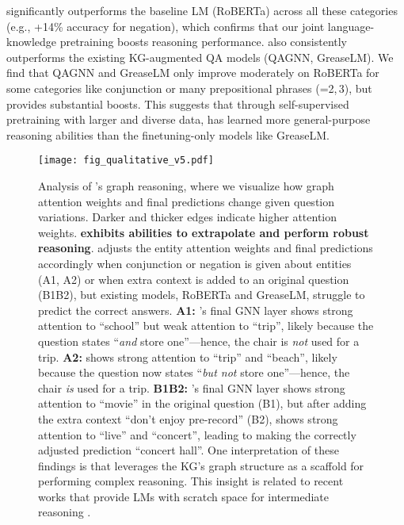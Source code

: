 \methodname significantly outperforms the baseline LM (RoBERTa) across all these categories (e.g., +14\% accuracy for negation), which confirms that our joint language-knowledge pretraining boosts reasoning performance.
\methodname also consistently outperforms the existing KG-augmented QA models (QAGNN, GreaseLM). We find that QAGNN and GreaseLM only improve moderately on RoBERTa for some categories like conjunction or many prepositional phrases (=2,\,3), but \methodname provides substantial boosts. This suggests that through self-supervised pretraining with larger and diverse data, \methodname has learned more general-purpose reasoning abilities than the finetuning-only models like GreaseLM.




\begin{figure}[t]
\vspace{-2mm}
    \hspace{-3mm}
    \texttt{[image: fig\_qualitative\_v5.pdf]}\vspace{-1mm}
    \caption{\footnotesize
    Analysis of \methodname's graph reasoning, where we visualize how graph attention weights and final predictions change given question variations. Darker and thicker edges indicate higher attention weights. \textbf{\methodname exhibits abilities to extrapolate and perform robust reasoning}. \methodname adjusts the entity attention weights and final predictions accordingly when conjunction or negation is given about entities (A1, A2) or when extra context is added to an original question (B1B2), but existing models, RoBERTa and GreaseLM, struggle to predict the correct answers.
    \textbf{A1:} \methodname's final GNN layer shows strong attention to ``school'' but weak attention to ``trip'', likely because the question states ``\textit{and} store one''---hence, the chair is \textit{not} used for a trip. 
    \textbf{A2:} \methodname shows strong attention to ``trip'' and ``beach'', likely because the question now states ``\textit{but not} store one''---hence, the chair \textit{is} used for a trip.
    \textbf{B1B2:} \methodname's final GNN layer shows strong attention to ``movie'' in the original question (B1), but after adding the extra context ``don't enjoy pre-record'' (B2), \methodname shows strong attention to ``live'' and ``concert'', leading to making the correctly adjusted prediction ``concert hall''.
    One interpretation of these findings is that \methodname leverages the KG's graph structure as a scaffold for performing complex reasoning. 
    This insight is related to recent works that provide LMs with scratch space for intermediate reasoning \cite{yasunaga2021qa, nye2021show, wei2022chain}.
    }
    \label{fig:qualitative}
    \vspace{1mm}
\end{figure}

